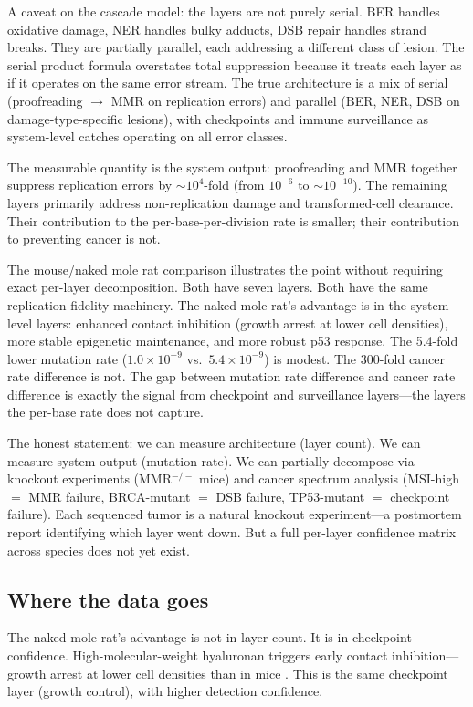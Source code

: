 \documentclass[11pt]{article}
\theoremstyle{definition}
\begin{document}
A caveat on the cascade model: the layers are not purely serial. BER
handles oxidative damage, NER handles bulky adducts, DSB repair handles
strand breaks. They are partially parallel, each addressing a different
class of lesion. The serial product formula overstates total suppression
because it treats each layer as if it operates on the same error stream.
The true architecture is a mix of serial (proofreading $\to$ MMR on
replication errors) and parallel (BER, NER, DSB on damage-type-specific
lesions), with checkpoints and immune surveillance as system-level
catches operating on all error classes.

The measurable quantity is the system output: proofreading and MMR
together suppress replication errors by $\sim 10^{4}$-fold (from
$10^{-6}$ to $\sim 10^{-10}$). The remaining layers primarily
address non-replication damage and transformed-cell clearance. Their
contribution to the per-base-per-division rate is smaller; their
contribution to preventing cancer is not.

The mouse/naked mole rat comparison illustrates the point without
requiring exact per-layer decomposition. Both have seven layers. Both
have the same replication fidelity machinery. The naked mole rat's
advantage is in the system-level layers: enhanced contact inhibition
(growth arrest at lower cell densities), more stable epigenetic
maintenance, and more robust p53 response. The 5.4-fold lower
mutation rate ($1.0 \times 10^{-9}$ vs.\ $5.4 \times 10^{-9}$)
is modest. The 300-fold cancer rate difference is not. The gap between
mutation rate difference and cancer rate difference is exactly the
signal from checkpoint and surveillance layers---the layers the
per-base rate does not capture.

The honest statement: we can measure architecture (layer count). We
can measure system output (mutation rate). We can partially decompose
via knockout experiments (MMR$^{-/-}$ mice) and cancer spectrum
analysis (MSI-high $=$ MMR failure, BRCA-mutant $=$ DSB failure,
TP53-mutant $=$ checkpoint failure). Each sequenced tumor is a
natural knockout experiment---a postmortem report identifying which
layer went down. But a full per-layer confidence matrix across species
does not yet exist.

\subsection{Where the data goes}

The naked mole rat's advantage is not in layer count. It is in
checkpoint confidence. High-molecular-weight hyaluronan triggers
early contact inhibition---growth arrest at lower cell densities
than in mice \cite{Seluanov2009}. This is the same checkpoint
layer (growth control), with higher detection confidence.
\end{document}
